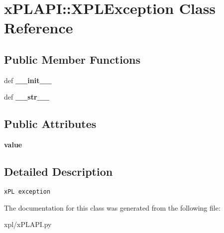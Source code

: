 \hypertarget{classxPLAPI_1_1XPLException}{
\section{xPLAPI::XPLException Class Reference}
\label{classxPLAPI_1_1XPLException}
}
\subsection*{Public Member Functions}
\begin{CompactItemize}
\item 
\hypertarget{classxPLAPI_1_1XPLException_fa97cb40136ea6f52c5b9ce792435e75}{
def \textbf{\_\-\_\-init\_\-\_\-}}
\label{classxPLAPI_1_1XPLException_fa97cb40136ea6f52c5b9ce792435e75}

\item 
\hypertarget{classxPLAPI_1_1XPLException_2713888a5319bbbeb96a991547dd127b}{
def \textbf{\_\-\_\-str\_\-\_\-}}
\label{classxPLAPI_1_1XPLException_2713888a5319bbbeb96a991547dd127b}

\end{CompactItemize}
\subsection*{Public Attributes}
\begin{CompactItemize}
\item 
\hypertarget{classxPLAPI_1_1XPLException_a426e1d994b5f51ef4249260b8357de7}{
\textbf{value}}
\label{classxPLAPI_1_1XPLException_a426e1d994b5f51ef4249260b8357de7}

\end{CompactItemize}


\subsection{Detailed Description}


\footnotesize\begin{verbatim}
xPL exception
\end{verbatim}
\normalsize
 

The documentation for this class was generated from the following file:\begin{CompactItemize}
\item 
xpl/xPLAPI.py\end{CompactItemize}
